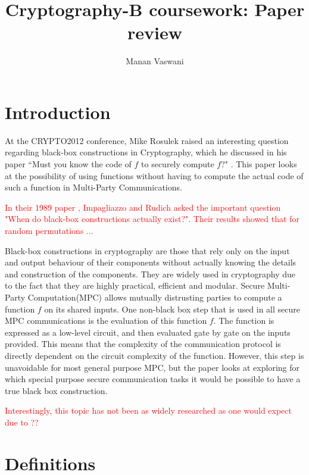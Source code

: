 \documentclass[11pt]{article}
\theoremstyle{theorem}
\theoremstyle{theorem}
\theoremstyle{remark}
\theoremstyle{note}
\theoremstyle{plain}
\theoremstyle{definition}
\begin{document}
\title{Cryptography-B coursework: Paper review}
\author{Manan Vaswani}

\maketitle

\section{Introduction}
At the CRYPTO2012 conference, Mike Rosulek raised an interesting question regarding black-box constructions in Cryptography, which he discussed in his paper ``Must you know the code of $f$ to securely compute $f$?"  \cite{C:Rosulek12a}. This paper looks at the possibility of using functions without having to compute the actual code of such a function in Multi-Party Communications.

\textcolor{red}{In their 1989 paper \cite{STOC:ImpRud89}, Impagliazzo and Rudich asked the important question "When do black-box constructions actually exist?". Their results showed that for random permutations ...}

Black-box constructions in cryptography are those that rely only on the input and output behaviour of their components without actually knowing the details and construction of the components. They are widely used in cryptography due to the fact that they are highly practical, efficient and modular. Secure Multi-Party Computation(MPC) allows mutually distrusting parties to compute a function $f$ on its shared inputs. One non-black box step that is used in all secure MPC communications is the evaluation of this function $f$. The function is expressed as a low-level circuit, and then evaluated gate by gate on the inputs provided. This means that the complexity of the communication protocol is directly dependent on the circuit complexity of the function. However, this step is unavoidable for most general purpose MPC, but the paper looks at exploring for which special purpose secure communication tasks it would be possible to have a true black box construction.

\textcolor{red}{Interestingly, this topic has not been as widely researched as one would expect due to ??}

\section{Definitions}
\end{document}
